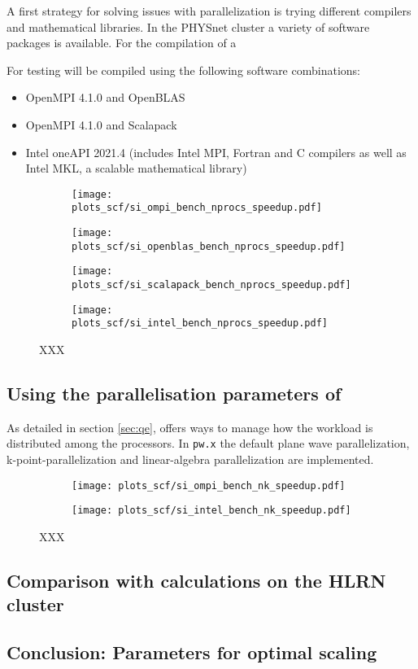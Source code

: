 \documentclass[main.tex]{subfiles}
\begin{document}
A first strategy for solving issues with parallelization is trying different compilers and mathematical libraries.
In the PHYSnet cluster a variety of software packages is available.
For the compilation of \QE a 

For testing \QE will be compiled using the following software combinations:
\begin{itemize}
    \item OpenMPI 4.1.0 and OpenBLAS
    \item OpenMPI 4.1.0 and Scalapack
    \item Intel oneAPI 2021.4 (includes Intel MPI, Fortran and C compilers as well as Intel MKL, a scalable mathematical library)
\end{itemize}

\begin{figure}[htbp]
\begin{subfigure}[b]{0.4\textwidth}
    \centering
    \texttt{[image: plots\_scf/si\_ompi\_bench\_nprocs\_speedup.pdf]}
\end{subfigure}
\begin{subfigure}[b]{0.4\textwidth}
    \centering
    \texttt{[image: plots\_scf/si\_openblas\_bench\_nprocs\_speedup.pdf]}
\end{subfigure}
\begin{subfigure}[b]{0.4\textwidth}
    \centering
    \texttt{[image: plots\_scf/si\_scalapack\_bench\_nprocs\_speedup.pdf]}
\end{subfigure}
\begin{subfigure}[b]{0.4\textwidth}
    \centering
    \texttt{[image: plots\_scf/si\_intel\_bench\_nprocs\_speedup.pdf]}
\end{subfigure}
\caption{XXX}
\label{fig:scaling_compilers_nprocs}
\end{figure}


\subsection{Using the parallelisation parameters of \QE}

As detailed in section \ref{sec:qe}, \QE offers ways to manage how the workload is distributed among the processors.
In \texttt{pw.x} the default plane wave parallelization, k-point-parallelization and linear-algebra parallelization are implemented.

\begin{figure}[htbp]
\begin{subfigure}[b]{0.4\textwidth}
    \centering
    \texttt{[image: plots\_scf/si\_ompi\_bench\_nk\_speedup.pdf]}
\end{subfigure}
\begin{subfigure}[b]{0.4\textwidth}
    \centering
    \texttt{[image: plots\_scf/si\_intel\_bench\_nk\_speedup.pdf]}
\end{subfigure}
\caption{XXX}
\label{fig:scaling_nk}
\end{figure}

\subsection{Comparison with calculations on the HLRN cluster}

\subsection{Conclusion: Parameters for optimal scaling}
\end{document}
